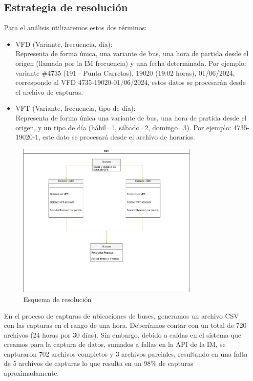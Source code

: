 \documentclass[journal]{IEEEtran}
\begin{document}
\subsection{Estrategia de resolución}
Para el análisis utilizaremos estos dos términos: 

\begin{itemize}
  \item VFD (Variante, frecuencia,  día): \\Representa de forma única, una variante de bus, una hora de partida desde el origen (llamada por la IM frecuencia) y una fecha determinada. Por ejemplo: variante \#4735 (191 - Punta Carretas), 19020 (19:02 horas), 01/06/2024, corresponde al VFD 4735-19020-01/06/2024, estos datos se procesarán desde el archivo de capturas.
  \item VFT (Variante, frecuencia, tipo de día): \\Representa de forma única una variante de bus, una hora de partida desde el origen, y un tipo de día (hábil=1, sábado=2, domingo=3). Por ejemplo: 4735-19020-1, este dato se procesará desde el archivo de horarios.
\end{itemize}

\begin{figure}
  \centering
  \includegraphics[width=9cm]{diagrama}
  \caption{Esquema de resolución}
\end{figure}

En el proceso de capturas de ubicaciones de buses, generamos un archivo CSV con las capturas en el rango de una hora. Deberíamos contar con un total de 720 archivos (24 horas por 30 días). Sin embargo, debido a caídas en el sistema que creamos para la captura de datos, sumados a fallas en la API de la IM, se capturaron 702 archivos completos y 3 archivos parciales, resultando en una falta de 5 archivos de capturas lo que resulta en un 98\% de capturas aproximadamente. \\
\end{document}
